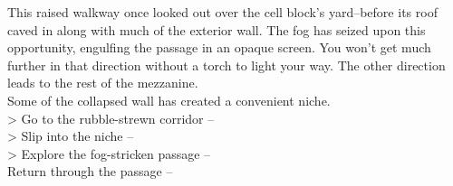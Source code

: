 This raised walkway once looked out over the cell block’s yard--before its roof caved in along with much of the exterior wall. The fog has seized upon this opportunity, engulfing the passage in an opaque screen. You won’t get much further in that direction without a torch to light your way. The other direction leads to the rest of the mezzanine.\\

Some of the collapsed wall has created a convenient niche.\\

> Go to the rubble-strewn corridor -- \\
> Slip into the niche -- \\
> Explore the fog-stricken passage -- \\
 Return through the passage -- 